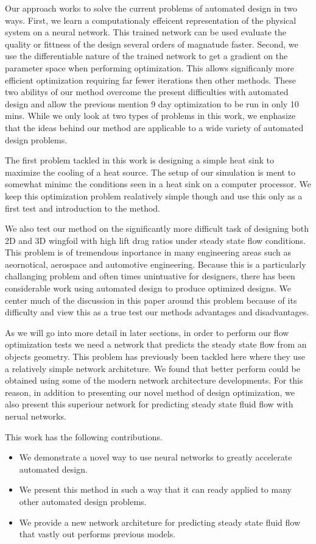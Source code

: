 \documentclass{article} %
\begin{document}
Our approach works to solve the current problems of automated design in two ways. First, we learn a computationaly effeicent representation of the physical system on a neural network. This trained network can be used evaluate the quality or fittness of the design several orders of magnatude faster. Second, we use the differentiable nature of the trained network to get a gradient on the parameter space when performing optimization. This allows significanly more efficient optimization requiring far fewer iterations then other methods. These two abilitys of our method overcome the present difficulties with automated design and allow the previous mention 9 day optimization to be run in only 10 mins. While we only look at two types of problems in this work, we enphasize that the ideas behind our method are applicable to a wide variety of automated design problems.

The first problem tackled in this work is designing a simple heat sink to maximize the cooling of a heat source. The setup of our simulation is ment to somewhat minimc the conditions seen in a heat sink on a computer processor. We keep this optimization problem realatively simple though and use this only as a first test and introduction to the method.

We also test our method on the significantly more difficult task of designing both 2D and 3D wingfoil with high lift drag ratios under steady state flow conditions. This problem is of tremendous inportance in many engineering areas such as aeornotical, aerospace and automotive engineering. Because this is a particularly challanging problem and often times unintuative for designers, there has been considerable work using automated design to produce optimized designs. We center much of the discussion in this paper around this problem because of its difficulty and view this as a true test our methods advantages and disadvantages.

As we will go into more detail in later sections, in order to perform our flow optimization tests we need a network that predicts the steady state flow from an objects geometry. This problem has previously been tackled here where they use a relatively simple network architeture. We found that better perform could be obtained using some of the modern network architecture developments. For this reason, in addition to presenting our novel method of design optimization, we also present this superiour network for predicting steady state fluid flow with nerual networks.

This work has the following contributions.
\begin{itemize}
  \item We demonstrate a novel way to use neural networks to greatly accelerate automated design.
  \item We present this method in such a way that it can ready applied to many other automated design problems.
  \item We provide a new network architeture for predicting steady state fluid flow that vastly out performs previous models.
\end{itemize}
\end{document}

